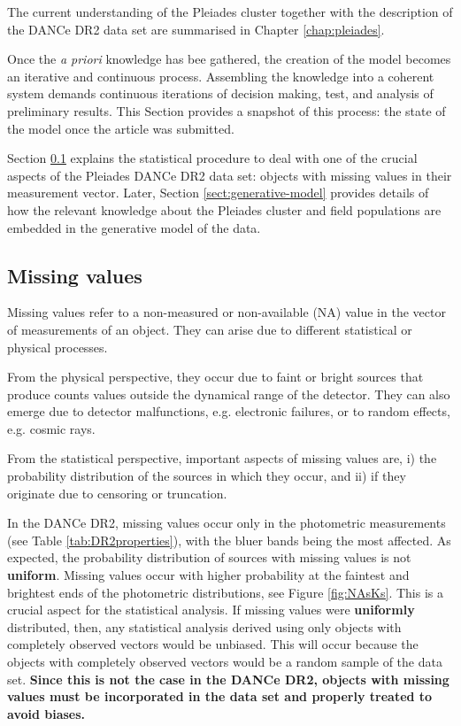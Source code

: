The current understanding of the Pleiades cluster together with the description of the DANCe DR2 data set are summarised in Chapter \ref{chap:pleiades}. 

Once the \emph{a priori} knowledge has bee gathered, the creation of the model becomes an iterative and continuous process. Assembling the knowledge into a coherent system demands continuous iterations of decision making, test, and analysis of preliminary results. This Section provides a snapshot of this process: the state of the model once the article \citet{Olivares2017} was submitted.

Section \ref{sect:missing} explains the statistical procedure to deal with one of the crucial aspects of the Pleiades DANCe DR2 data set: objects with missing values in their measurement vector. Later, Section \ref{sect:generative-model} provides details of how the relevant knowledge about the Pleiades cluster and field populations are embedded in the generative model of the data.
\subsection{Missing values}
\label{sect:missing}

Missing values refer to a non-measured or non-available (NA) value in the vector of measurements of an object. They can arise due to different statistical or physical processes. 

From the physical perspective, they occur due to faint or bright sources that produce counts values outside the dynamical range of the detector. They can also emerge due to detector malfunctions, e.g. electronic failures, or to random effects, e.g. cosmic rays. 

From the statistical perspective, important aspects of missing values are, i) the probability distribution of the sources in which they occur, and ii) if they originate due to censoring or truncation. 

In the DANCe DR2, missing values occur only in the photometric measurements (see Table \ref{tab:DR2properties}), with the bluer bands being the most affected. As expected, the probability distribution of sources with missing values is not \textbf{uniform}. Missing values occur with higher probability at the faintest and brightest ends of the photometric distributions, see Figure \ref{fig:NAsKs}. This is a crucial aspect for the statistical analysis. If missing values were \textbf{uniformly} distributed, then, any statistical analysis derived using only objects with completely observed vectors would be unbiased. This will occur because the objects with completely observed vectors would be a random sample of the data set. \textbf{Since this is not the case in the DANCe DR2, objects with missing values must be incorporated in the data set and properly treated to avoid biases.} 

